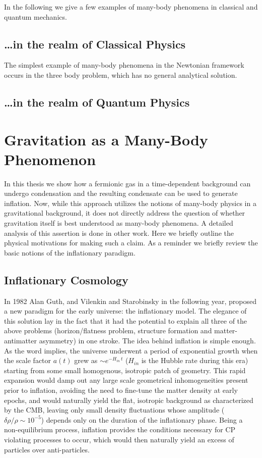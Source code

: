 \documentclass[11pt,english,rmp]{revtex4}
\begin{document}
In the following we give a few examples of many-body phenomena in classical and quantum mechanics.

\subsection{\dots in the realm of Classical Physics}

The simplest example of many-body phenomena in the Newtonian framework occurs in the three body problem, which has no general analytical solution.

\subsection{\dots in the realm of Quantum Physics}

\section{Gravitation as a Many-Body Phenomenon}

In this thesis we show how a fermionic gas in a time-dependent background
can undergo condensation and the resulting condensate can be used
to generate inflation. Now, while this approach utilizes the notions
of many-body physics in a gravitational background, it does not directly
address the question of whether gravitation itself is best understood
as many-body phenomena. A detailed analysis of this assertion is done
in other work. Here we briefly outline the physical motivations for
making such a claim. As a reminder we briefly review the basic notions of the inflationary paradigm.

\subsection{Inflationary Cosmology}

In 1982 Alan Guth, and Vilenkin and Starobinsky in the following year,
proposed a new paradigm for the early universe: the inflationary model.
The elegance of this solution lay in the fact that it had the potential
to explain all three of the above problems (horizon/flatness problem,
structure formation and matter-antimatter asymmetry) in one stroke.
The idea behind inflation is simple enough. As the word implies, the
universe underwent a period of exponential growth when the scale factor
$a(t)$ grew as $\sim e^{-H_{in}\,t}$ ($H_{in}$ is the Hubble rate
during this era) starting from some small homogenous, isotropic patch
of geometry. This rapid expansion would damp out any large scale geometrical
inhomogeneities present prior to inflation, avoiding the need to fine-tune
the matter density at early epochs, and would naturally yield the
flat, isotropic background as characterized by the CMB, leaving only
small density fluctuations whose amplitude ($\delta\rho/\rho\sim10^{-5}$)
depends only on the duration of the inflationary phase. Being a non-equilibrium
process, inflation provides the conditions necessary for CP violating
processes to occur, which would then naturally yield an excess of
particles over anti-particles.
\end{document}
